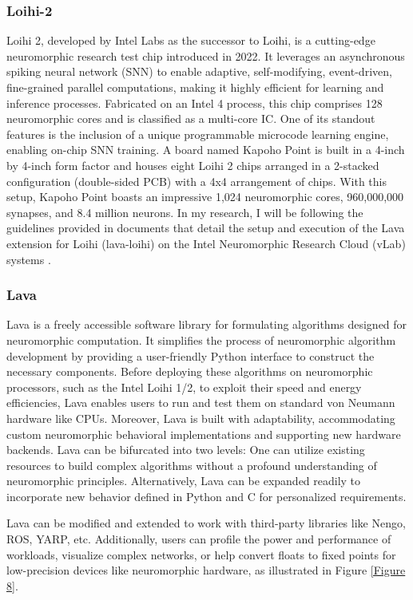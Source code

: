 \subsubsection{Loihi-2}

Loihi 2, developed by Intel Labs as the successor to Loihi, is a cutting-edge neuromorphic research test chip introduced in 2022. It leverages an asynchronous spiking neural network (SNN) to enable adaptive, self-modifying, event-driven, fine-grained parallel computations, making it highly efficient for learning and inference processes. Fabricated on an Intel 4 process, this chip comprises 128 neuromorphic cores and is classified as a multi-core IC. One of its standout features is the inclusion of a unique programmable microcode learning engine, enabling on-chip SNN training. A board named Kapoho Point is built in a 4-inch by 4-inch form factor and houses eight Loihi 2 chips arranged in a 2-stacked configuration (double-sided PCB) with a 4x4 arrangement of chips. With this setup, Kapoho Point boasts an impressive 1,024 neuromorphic cores, 960,000,000 synapses, and 8.4 million neurons. In my research, I will be following the guidelines provided in documents that detail the setup and execution of the Lava extension for Loihi (lava-loihi) on the Intel Neuromorphic Research Cloud (vLab) systems \cite{WinNT, WinNT2}.


\subsubsection{Lava}

Lava is a freely accessible software library for formulating algorithms designed for neuromorphic computation. It simplifies the process of neuromorphic algorithm development by providing a user-friendly Python interface to construct the necessary components. Before deploying these algorithms on neuromorphic processors, such as the Intel Loihi 1/2, to exploit their speed and energy efficiencies, Lava enables users to run and test them on standard von Neumann hardware like CPUs. Moreover, Lava is built with adaptability, accommodating custom neuromorphic behavioral implementations and supporting new hardware backends. Lava can be bifurcated into two levels: One can utilize existing resources to build complex algorithms without a profound understanding of neuromorphic principles. Alternatively, Lava can be expanded readily to incorporate new behavior defined in Python and C for personalized requirements.

Lava can be modified and extended to work with third-party libraries like Nengo, ROS, YARP, etc. Additionally, users can profile the power and performance of workloads, visualize complex networks, or help convert floats to fixed points for low-precision devices like neuromorphic hardware, as illustrated in Figure \ref{Figure 8}.


